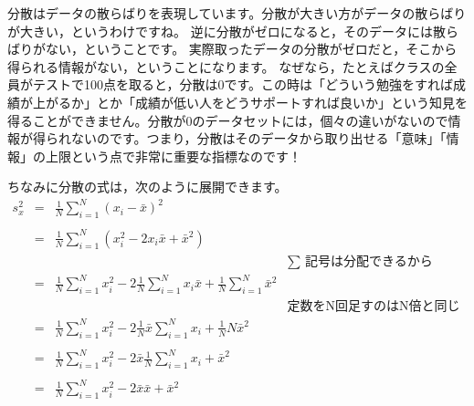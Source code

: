 \documentclass{ltjsbook}
\begin{document}
分散はデータの散らばりを表現しています。分散が大きい方がデータの散らばりが大きい，というわけですね。
逆に分散がゼロになると，そのデータには散らばりがない，ということです。
実際取ったデータの分散がゼロだと，そこから得られる情報がない，ということになります。
なぜなら，たとえばクラスの全員がテストで100点を取ると，分散は0です。この時は「どういう勉強をすれば成績が上がるか」とか「成績が低い人をどうサポートすれば良いか」という知見を得ることができません。分散が0のデータセットには，個々の違いがないので情報が得られないのです。つまり，分散はそのデータから取り出せる「意味」「情報」の上限という点で非常に重要な指標なのです！

ちなみに分散の式は，次のように展開できます。
\[
	\begin{array}{lllr}\label{ref:variance_form2}
		s_x^2 & = & \frac{1}{N}\sum_{i=1}^N (x_i - \bar{x})^2                                                                                           \\
		\\
		      & = & \frac{1}{N}\sum_{i=1}^N (x_i^2 - 2x_i\bar{x} + \bar{x}^2)                                                                           \\
		      &   &                                                                                                          & \mbox{$\sum$ 記号は分配できるから} \\
		      & = & \frac{1}{N}\sum_{i=1}^N x_i^2 - 2\frac{1}{N}\sum_{i=1}^N x_i\bar{x} + \frac{1}{N}\sum_{i=1}^N \bar{x}^2                            \\
		      &   &                                                                                                          & \mbox{定数をN回足すのはN倍と同じなので} \\
		      & = & \frac{1}{N}\sum_{i=1}^N x_i^2 - 2\frac{1}{N}\bar{x}\sum_{i=1}^N x_i + \frac{1}{N}N\bar{x}^2                                       \\
		      &   &                                                                                                                                     \\
		      & = & \frac{1}{N}\sum_{i=1}^N x_i^2 - 2\bar{x}\frac{1}{N}\sum_{i=1}^N x_i + \bar{x}^2                                                    \\
		      &   &                                                                                                                                     \\
		      & = & \frac{1}{N}\sum_{i=1}^N x_i^2 - 2\bar{x}\bar{x}+ \bar{x}^2                                                                         \\

\end{array}\]
\end{document}
